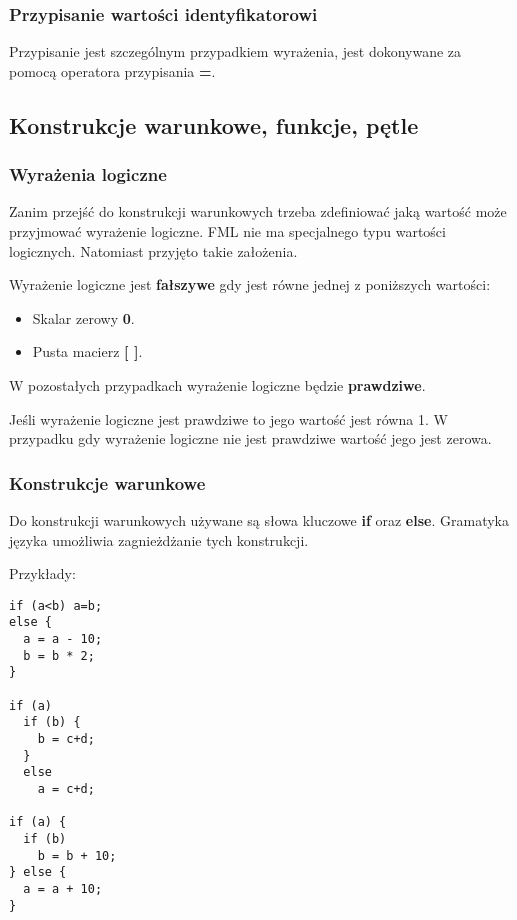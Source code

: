 \documentclass[12pt,a4paper]{article}
\begin{document}
\subsubsection{Przypisanie wartości identyfikatorowi}

Przypisanie jest szczególnym przypadkiem wyrażenia, jest dokonywane za pomocą operatora przypisania \textbf{=}. 

\subsection{Konstrukcje warunkowe, funkcje, pętle}

\subsubsection{Wyrażenia logiczne}

Zanim przejść do konstrukcji warunkowych trzeba zdefiniować jaką wartość może przyjmować wyrażenie logiczne. FML nie ma specjalnego typu wartości logicznych. Natomiast przyjęto takie założenia.

Wyrażenie logiczne jest \textbf{fałszywe} gdy jest równe jednej z poniższych wartości:

\begin{itemize}
  \item Skalar zerowy \textbf{0}.
  \item Pusta macierz \textbf{[ ]}.
\end{itemize}

W pozostałych przypadkach wyrażenie logiczne będzie \textbf{prawdziwe}.

Jeśli wyrażenie logiczne jest prawdziwe to jego wartość jest równa 1. W przypadku gdy wyrażenie logiczne nie jest prawdziwe wartość jego jest zerowa.

\subsubsection{Konstrukcje warunkowe}

Do konstrukcji warunkowych używane są słowa kluczowe \textbf{if} oraz \textbf{else}. Gramatyka języka umożliwia zagnieżdżanie tych konstrukcji.

Przykłady:
\lstset{language=Python}
\begin{lstlisting}
if (a<b) a=b;
else {
  a = a - 10;
  b = b * 2;
}

if (a)
  if (b) {
    b = c+d;
  }
  else
    a = c+d;
    
if (a) {
  if (b)
    b = b + 10;
} else { 
  a = a + 10;
}

\end{lstlisting}
\end{document}
